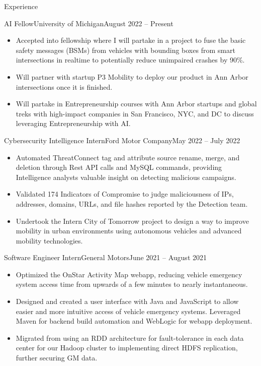 \documentclass[]{mcdowellcv}
\begin{document}
	\begin{cvsection}{Experience}
		\begin{cvsubsection}{AI Fellow}{University of Michigan}{August 2022 -- Present}
			\small{
				\begin{itemize}
					\item Accepted into fellowship where I will partake in a project to fuse the basic safety messages (BSMs) from vehicles with bounding boxes from smart intersections in realtime to potentially reduce unimpaired crashes by 90\%.
					\item Will partner with startup P3 Mobility to deploy our product in Ann Arbor intersections once it is finished.
					\item Will partake in Entrepreneurship courses with Ann Arbor startups and global treks with high-impact companies in San Francisco, NYC, and DC to discuss leveraging Entrepreneurship with AI.
				\end{itemize}
			}
		\end{cvsubsection}
		
		\begin{cvsubsection}{Cybersecurity Intelligence Intern}{Ford Motor Company}{May 2022 -- July 2022}
			\small{
				\begin{itemize}
					\item Automated ThreatConnect tag and attribute source rename, merge, and deletion through Rest API calls and MySQL commands, providing Intelligence analysts valuable insight on detecting malicious campaigns.
					\item Validated 174 Indicators of Compromise to judge maliciousness of IPs, addresses, domains, URLs, and file hashes reported by the Detection team.
					\item Undertook the Intern City of Tomorrow project to design a way to improve mobility in urban environments using autonomous vehicles and advanced mobility technologies.
				\end{itemize}
			}
		\end{cvsubsection}
		
		\begin{cvsubsection}{Software Engineer Intern}{General Motors}{June 2021 -- August 2021}
			\small{
				\begin{itemize}
					\item Optimized the OnStar Activity Map webapp, reducing vehicle emergency system access time from upwards of a few minutes to nearly instantaneous.
					\item Designed and created a user interface with Java and JavaScript to allow easier and more intuitive access of vehicle emergency systems. Leveraged Maven for backend build automation and WebLogic for webapp deployment.
					\item Migrated from using an RDD architecture for fault-tolerance in each data center for our Hadoop cluster to implementing direct HDFS replication, further securing GM data.
				\end{itemize}
			}
		\end{cvsubsection}
		

\end{cvsection}
\end{document}
